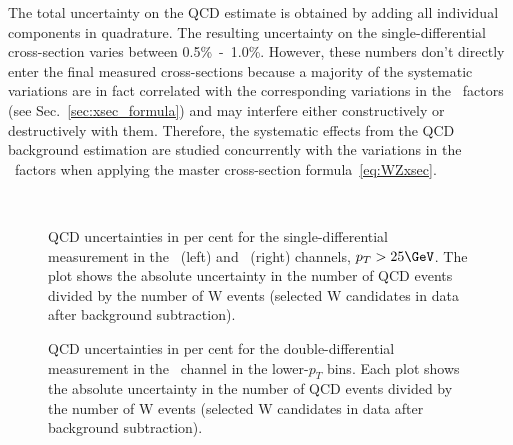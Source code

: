 The total uncertainty on the QCD estimate is obtained by adding all individual components in quadrature. The resulting uncertainty on the single-differential cross-section varies between 0.5\%~-~1.0\%. However, these numbers don't directly enter the final measured cross-sections because a majority of the systematic variations are in fact correlated with the corresponding variations in the \C\ factors (see Sec.~\ref{sec:xsec_formula}) and may interfere either constructively or destructively with them. Therefore, the systematic effects from the QCD background estimation are studied concurrently with the variations in the \C\ factors when applying the master cross-section formula~\ref{eq:WZxsec}.

\begin{figure}[phtb]
  \begin{center}
        \\
 \caption{QCD uncertainties in per cent for the single-differential measurement in the \Wmunup\ (left) and \Wmunum\ (right) channels, $p_{T} > 25 \GeV$. The plot shows the absolute uncertainty in the number of QCD events divided by the number of W events (selected W candidates in data after background subtraction).}
 \label{fig:Wmunu:qcd_unc_vsEta_pt25}
 \end{center}
\end{figure}

\begin{figure}[phtb]
  \begin{center}
 \caption{QCD uncertainties in per cent for the double-differential measurement in the \Wmunup\ channel in the lower-$p_{T}$ bins. Each plot shows the absolute uncertainty in the number of QCD events divided by the number of W events (selected W candidates in data after background subtraction).}
 \label{fig:Wmunu:qcd_unc_vsEta_vsPt_pos_p1}
 \end{center}
\end{figure}

